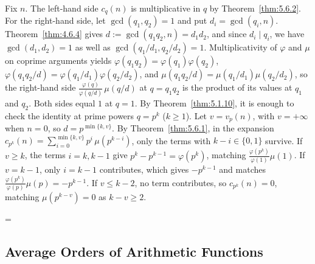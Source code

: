 \documentclass[11pt]{article}
\makeatletter
\theoremstyle{ntstyle}
\let\nt@closedisplay\]
\def\nt@guardedclose{\@ifnextchar\par{\nt@closeafterpar}{\@ifnextchar\end{\postdisplaypenalty\@M\nt@closedisplay}{\nt@closedisplay}}}
\def\nt@closeafterpar\par{\@ifnextchar\par{\nt@closeafterpar}{\@ifnextchar\end{\postdisplaypenalty\@M\nt@closedisplay\par}{\nt@closedisplay\par}}}
\renewenvironment{proof}[1][\proofname]{\par
  \pushQED{\qed}\normalfont\topsep\medskipamount\edef\nt@afterproof{\@endparpenalty=\the\@endparpenalty\relax}\@beginparpenalty\@M\@endparpenalty\@M\let\]\nt@guardedclose\trivlist\item[]\textit{#1\@addpunct{.}} \ignorespaces}{\ifvmode\addpenalty\@M\fi\popQED\nt@afterproof\endtrivlist\@endpefalse}
\makeatother
\begin{document}
\begin{proof} Fix $n$. The left-hand side $c_q(n)$ is multiplicative in $q$ by Theorem~\ref{thm:5.6.2}. For the right-hand side, let $\gcd(q_1, q_2) = 1$ and put $d_i = \gcd(q_i, n)$. Theorem~\ref{thm:4.6.4} gives $d := \gcd(q_1 q_2, n) = d_1 d_2$, and since $d_i \mid q_i$, we have $\gcd(d_1, d_2) = 1$ as well as $\gcd(q_1/d_1, q_2/d_2) = 1$. Multiplicativity of $\varphi$ and $\mu$ on coprime arguments yields $\varphi(q_1 q_2) = \varphi(q_1)\varphi(q_2)$, $\varphi(q_1 q_2/d) = \varphi(q_1/d_1)\varphi(q_2/d_2)$, and $\mu(q_1 q_2/d) = \mu(q_1/d_1)\mu(q_2/d_2)$, so the right-hand side $\tfrac{\varphi(q)}{\varphi(q/d)}\,\mu(q/d)$ at $q = q_1 q_2$ is the product of its values at $q_1$ and $q_2$. Both sides equal
	$1$ at $q = 1$. By Theorem~\ref{thm:5.1.10}, it is enough to
	check the identity at prime powers $q = p^{k}$ ($k \ge 1$). Let $v=v_p(n)$, with $v=+\infty$ when $n=0$, so
	$d=p^{\min\{k,v\}}$. By Theorem~\ref{thm:5.6.1}, in the expansion $c_{p^{k}}(n) = \sum_{i=0}^{\min\{k, v\}}
	p^{i}\, \mu(p^{k-i})$, only the terms with $k - i \in \{0,1\}$ survive. If $v \ge k$,
	the terms $i = k, k-1$ give $p^{k} - p^{k-1} = \varphi(p^{k})$,
	matching $\tfrac{\varphi(p^{k})}{\varphi(1)}\mu(1)$. If $v = k-1$,
	only $i = k-1$ contributes, which gives $-p^{k-1}$ and matches
	$\tfrac{\varphi(p^{k})}{\varphi(p)}\mu(p) = -p^{k-1}$. If $v \le k-2$,
	no term contributes, so $c_{p^{k}}(n) = 0$, matching $\mu(p^{k-v}) = 0$
	as $k - v \ge 2$.

\end{proof}
\subsection{Average Orders of Arithmetic Functions}
\end{document}
